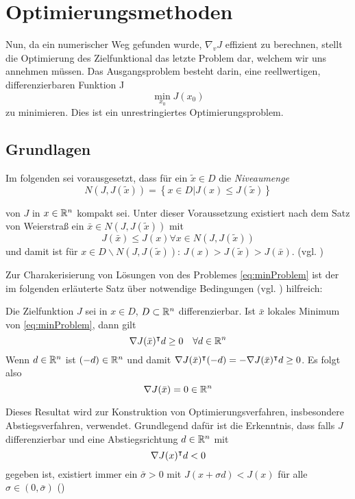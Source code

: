 \section{Optimierungsmethoden}

Nun, da ein numerischer Weg gefunden wurde, $\nabla_v J$ effizient zu berechnen, stellt die Optimierung des Zielfunktional das letzte Problem dar, welchem wir uns annehmen müssen. Das Ausgangsproblem besteht darin, eine reellwertigen, differenzierbaren Funktion J
\begin{equation}
\label{eq:minProblem}
 \min_{x_0} J(x_0) 
\end{equation}
zu minimieren. Dies ist ein unrestringiertes Optimierungsproblem. 

\subsection{Grundlagen}
Im folgenden sei vorausgesetzt, dass für ein $\tilde x\in D$ die \textit{Niveaumenge}
 \begin{equation}
 \label{eq:niveauset}
  N(J,J(\tilde x)) = \left\{ x\in D \vert J(x)\leq J(\tilde x)\right\}
 \end{equation}

  

 von $J$ in $x\in \mathbb{R}^n$ kompakt sei. Unter dieser Voraussetzung existiert nach dem Satz von Weierstraß ein $\bar x \in N(J,J(\tilde x))$ mit 
 \[
  J(\bar x) \leq J(x) \forall x\in N(J,J(\tilde x))
 \]
 und damit ist für $x\in D\backslash N(J,J(\tilde x))$: $J(x)>J(\tilde x)> J(\bar x)$. (vgl. \cite[Satz 1.2.2]{alt2002nichtlineare})
 

Zur Charakerisierung von Lösungen von des Problemes \eqref{eq:minProblem} ist der im folgenden erläuterte Satz über notwendige Bedingungen (vgl. \cite[vgl. Satz 3.1.1 ff.]{alt2002nichtlineare}) hilfreich:
\begin{theorem} 
\label{thm:optnotbed}
 Die Zielfunktion $J$ sei in $x\in D$, $D\subset \mathbb{R}^n$ differenzierbar. Ist $\bar x$ lokales Minimum von \eqref{eq:minProblem}, dann gilt
 \[
  \nabla J(\bar x)^\intercal d \geq 0 \quad \forall d\in \mathbb{R}^n
 \]
 Wenn $d\in \mathbb{R}^n$ ist $(-d)\in \mathbb{R}^n$ und damit $\nabla J(\bar x)^\intercal (-d) =  - \nabla J(\bar x)^\intercal d  \geq 0$. Es folgt also
 \[
  \nabla J(\bar x)  =0 \in \mathbb{R}^n
 \]
\end{theorem}

Dieses Resultat wird zur Konstruktion von Optimierungsverfahren, insbesondere Abstiegsverfahren, verwendet. 
Grundlegend dafür ist die Erkenntnis, dass falls $J$ differenzierbar und eine Abstiegsrichtung $d\in \mathbb{R}^n$ mit 
\[
\nabla J(x)^\intercal d<0 
\]
gegeben ist, existiert immer ein $\bar \sigma>0$ mit $J(x+\sigma d)< J(x)$ für alle $\sigma \in (0,\bar \sigma)$ (\cite[vgl. Satz 4.1.1]{alt2002nichtlineare})


